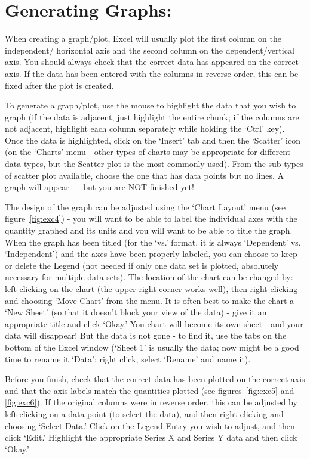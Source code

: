 \section*{Generating Graphs:}
When creating a graph/plot, Excel will usually plot the first column on the independent/ horizontal axis and the second column on the dependent/vertical axis. 
You should always check that the correct data has appeared on the correct axis. 
If the data has been entered with the columns in reverse order, this can be fixed after the plot is created.
\par
To generate a graph/plot, use the mouse to highlight the data that you wish to graph (if the data is adjacent, just highlight the entire chunk; if the columns are not adjacent, highlight each column separately while holding the `Ctrl' key). 
Once the data is highlighted, click on the `Insert' tab and then the `Scatter' icon (on the `Charts' menu - other types of charts may be appropriate for different data types, but the Scatter plot is the most commonly used). 
From the sub-types of scatter plot available, choose the one that has data points but no lines. 
A graph will appear — but you are NOT finished yet!
\par
The design of the graph can be adjusted using the `Chart Layout' menu (see figure~\ref{fig:exc4}) - you will want to be able to label the individual axes with the quantity graphed and its units and you will want to be able to title the graph. 
When the graph has been titled (for the `vs.' format, it is always `Dependent' vs. `Independent') and the axes have been properly labeled, you can choose to keep or delete the Legend (not needed if only one data set is plotted, absolutely necessary for multiple data sets). 
The location of the chart can be changed by: left-clicking on the chart (the upper right corner works well), then right clicking and choosing `Move Chart' from the menu. 
It is often best to make the chart a `New Sheet' (so that it doesn't block your view of the data) - give it an appropriate title and click `Okay.' 
You chart will become its own sheet - and your data will disappear! 
But the data is not gone - to find it, use the tabs on the bottom of the Excel window (`Sheet 1' is usually the data; now might be a good time to rename it `Data': right click, select `Rename' and name it).
\par 
Before you finish, check that the correct data has been plotted on the correct axis and that the axis labels match the quantities plotted (see figures~\ref{fig:exc5} and \ref{fig:exc6}). 
If the original columns were in reverse order, this can be adjusted by left-clicking on a data point (to select the data), and then right-clicking and choosing `Select Data.' 
Click on the Legend Entry you wish to adjust, and then click `Edit.' 
Highlight the appropriate Series X and Series Y data and then click `Okay.'

